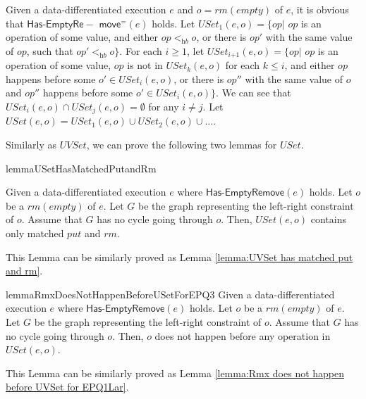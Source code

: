 Given a data-differentiated execution $e$ and $o = \textit{rm}(\textit{empty})$ of $e$, it is obvious that $\mathsf{Has\text{-}}\mathsf{EmptyRe-}$ $\mathsf{move}^{=}(e)$ holds. Let $\textit{USet}_1(e,o) = \{ \textit{op} \vert$ $\textit{op}$ is an operation of some value, and either $\textit{op} <_{\textit{hb}} o$, or there is $\textit{op}'$ with the same value of $\textit{op}$, such that $\textit{op}' <_{\textit{hb}} o \}$. For each $i \geq 1$, let $\textit{USet}_{\textit{i+1}}(e,o) = \{ \textit{op} \vert$ $\textit{op}$ is an operation of some value, $\textit{op}$ is not in $\textit{USet}_k(e,o)$ for each $k \leq i$, and either $\textit{op}$ happens before some $o' \in \textit{USet}_i(e,o)$, or there is $\textit{op}''$ with the same value of $o$ and $\textit{op}''$ happens before some $o' \in \textit{USet}_i(e,o) \}$. We can see that $\textit{USet}_i(e,o) \cap \textit{USet}_j(e,o) = \emptyset$ for any $i \neq j$. Let $\textit{USet}(e,o) = \textit{USet}_1(e,o) \cup \textit{USet}_2(e,o) \cup \ldots$.


Similarly as $\textit{UVSet}$, we can prove the following two lemmas for $\textit{USet}$.

\begin{restatable}{lemma}{USetHasMatchedPutandRm}
\label{lemma:USet has matched put and rm} 

Given a data-differentiated execution $e$ where $\mathsf{Has\text{-}EmptyRemove}(e)$ holds. Let $o$ be a $\textit{rm}(\textit{empty})$ of $e$. Let $G$ be the graph representing the left-right constraint of $o$. Assume that $G$ has no cycle going through $o$. Then, $\textit{USet}(e,o)$ contains only matched $\textit{put}$ and $\textit{rm}$. 
\end{restatable}

This Lemma can be similarly proved as Lemma \ref{lemma:UVSet has matched put and rm}.


\begin{restatable}{lemma}{RmxDoesNotHappenBeforeUSetForEPQ3}
\label{lemma:Rmx does not happen before USet for EPQ3} 
Given a data-differentiated execution $e$ where $\mathsf{Has\text{-}EmptyRemove}(e)$ holds. Let $o$ be a $\textit{rm}(\textit{empty})$ of $e$. Let $G$ be the graph representing the left-right constraint of $o$. Assume that $G$ has no cycle going through $o$. Then, $o$ does not happen before any operation in $\textit{USet}(e,o)$. 
\end{restatable}

This Lemma can be similarly proved as Lemma \ref{lemma:Rmx does not happen before UVSet for EPQ1Lar}.

